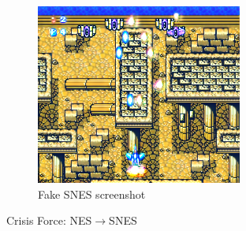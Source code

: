 \documentclass[10pt,twocolumn,letterpaper]{article}
\begin{document}
\begin{figure}[H]
\begin{subfigure}[b]{0.235\textwidth}
      \includegraphics[width=\textwidth]{figures/nes_to_snes/Crisis_Force_(J)__ucc__12_fake_B.png}
      \caption{Fake SNES screenshot}
      \label{fig:ss3b}
   \end{subfigure}
   \caption{Crisis Force: NES$\rightarrow$SNES}
\end{figure}
\end{document}
